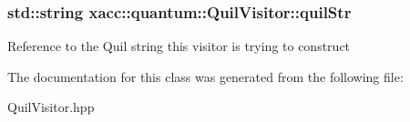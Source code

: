 \subsubsection[{\texorpdfstring{quil\+Str}{quilStr}}]{\setlength{\rightskip}{0pt plus 5cm}std\+::string xacc\+::quantum\+::\+Quil\+Visitor\+::quil\+Str\hspace{0.3cm}{\ttfamily [protected]}}\hypertarget{a00241_afd04300ce4dab03448a09f9bee448ca6}{}\label{a00241_afd04300ce4dab03448a09f9bee448ca6}
Reference to the Quil string this visitor is trying to construct 

The documentation for this class was generated from the following file\+:\begin{DoxyCompactItemize}
\item 
Quil\+Visitor.\+hpp\end{DoxyCompactItemize}
